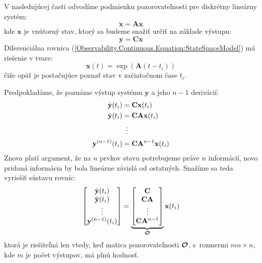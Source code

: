 \documentclass[a4paper, 10pt, ]{article}
\begin{document}
V nasledujúcej časti odvodíme podmienku pozorovateľnosti pre diskrétny lineárny systém:
\begin{equation}
    \label{Observability.Continuous.Equation:StateSpaceModel}
    \dot{\bm{x}} = \bm{A} \bm{x}
\end{equation}
kde $\bm{x}$ je vnútorný stav, ktorý sa budeme snažiť určiť na základe výstupu:
\begin{equation}
    \label{Observability.Continuous.Equation:Output}
    \bm{y} = \bm{C} \bm{x}
\end{equation}
Diferenciálna rovnica (\ref{Observability.Continuous.Equation:StateSpaceModel}) má riešenie v tvare:
\begin{equation}
    \bm{x}(t) = \exp \left( \bm{A} (t - t_i) \right)
\end{equation}
čiže opäť je postačujúce poznať stav v začiatočnom čase $t_i$.

Predpokladáme, že poznáme výstup systému $\bm{y}$ a jeho $n - 1$ derivácií:
\begin{subequations}
    \label{Observability.Continuous.Equation:OutputSystem}
    \begin{align}
        \dot{\bm{y}}(t_i)     &= \bm{C} \bm{x}(t_i)                \\
        \ddot{\bm{y}}(t_i)    &= \bm{C} \bm{A} \bm{x}(t_i)         \\
        &\vdotswithin{=}                                           \\
        \bm{y}^{(n - 1)}(t_i) &= \bm{C} \bm{A}^{n - 1} \bm{x}(t_i)
    \end{align}
\end{subequations}
Znova platí argument, že na $n$ prvkov stavu potrebujeme práve $n$ informácií, novo pridaná informácia by bola lineárne závislá od ostatných. Snažíme sa teda vyriešiť sústavu rovníc:
\begin{equation}
    \label{Observability.Continuous.Equation:OutputSystemMatrix}
    \begin{bmatrix}
        \dot{\mathbf{y}}(t_i)     \\
        \ddot{\mathbf{y}}(t_i)    \\
        \vdots                \\
        \mathbf{y}^{(n - 1)}(t_i)
    \end{bmatrix} = 
    \underbrace{
        \begin{bmatrix}
            \mathbf{C}                \\
            \mathbf{C} \mathbf{A}         \\
            \vdots                \\
            \mathbf{C} \mathbf{A}^{n - 1} \\
        \end{bmatrix}
    }_{\boldsymbol{\mathcal{O}}}
    \mathbf{x}(t_i)
\end{equation}
ktorá je riešiteľná len vtedy, keď matica pozorovateľnosti $\boldsymbol{\mathcal{O}}$, s~rozmermi $mn \times n$, kde $m$ je počet výstupov, má plnú hodnosť.
\end{document}
